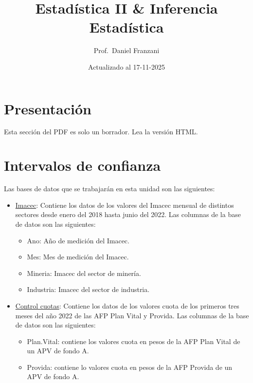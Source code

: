 \documentclass[
  11pt,
]{book}
\title{Estadística II \& Inferencia Estadística}
\author{Prof.~Daniel Franzani}
\date{Actualizado al 17-11-2025}
\providecommand{\tightlist}{%
  \setlength{\itemsep}{0pt}\setlength{\parskip}{0pt}}
\theoremstyle{definition}
\theoremstyle{definition}
\theoremstyle{definition}
\theoremstyle{definition}
\theoremstyle{remark}
\begin{document}
\maketitle

{
\setcounter{tocdepth}{3}
\tableofcontents
}
\chapter*{Presentación}\label{presentacion}

Esta sección del PDF es solo un borrador. Lea la versión HTML.

\chapter{Intervalos de confianza}\label{intervalos-de-confianza}

Las bases de datos que se trabajarán en esta unidad son las siguientes:

\begin{itemize}
\item
  \label{Imacec1}\href{https://raw.githubusercontent.com/Dfranzani/Bases-de-datos-para-cursos/main/2022-2/Estad\%C3\%ADstica\%201/imacec.csv}{Imacec}: Contiene los datos de los valores del Imacec mensual de distintos sectores desde enero del 2018 hasta junio del 2022. Las columnas de la base de datos son las siguientes:

  \begin{itemize}
  \tightlist
  \item
    Ano: Año de medición del Imacec.
  \item
    Mes: Mes de medición del Imacec.
  \item
    Mineria: Imacec del sector de minería.
  \item
    Industria: Imacec del sector de industria.
  \end{itemize}
\item
  \label{Cuotas}\href{https://raw.githubusercontent.com/Dfranzani/Bases-de-datos-para-cursos/main/2023-1/control\%2Bcuotas.csv}{Control cuotas}: Contiene los datos de los valores cuota de los primeros tres meses del año 2022 de las AFP Plan Vital y Provida. Las columnas de la base de datos son las siguientes:

  \begin{itemize}
  \tightlist
  \item
    Plan.Vital: contiene los valores cuota en pesos de la AFP Plan Vital de un APV de fondo A.
  \item
    Provida: contiene lo valores cuota en pesos de la AFP Provida de un APV de fondo A.
  \end{itemize}
\end{itemize}
\end{document}
